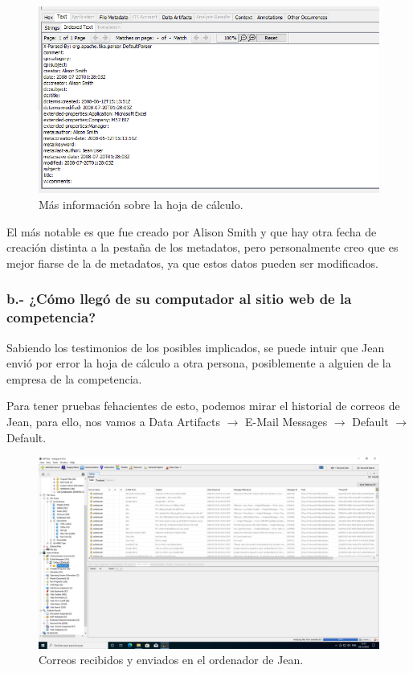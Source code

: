 \documentclass{article}
\begin{document}
\begin{figure}[H]
    \centering
    \includegraphics[width=\textwidth]{imagenes/Windows/Captura de pantalla (7).png}
    \caption{Más información sobre la hoja de cálculo.}
\end{figure}

El más notable es que fue creado por Alison Smith y que hay otra fecha de creación distinta a la pestaña de los metadatos, pero personalmente creo que es mejor fiarse de la de metadatos, ya que estos datos pueden ser modificados.

\newpage

{}
\subsubsection*{b.- ¿Cómo llegó de su computador al sitio web de la competencia?}

Sabiendo los testimonios de los posibles implicados, se puede intuir que Jean envió por error la hoja de cálculo a otra persona, posiblemente a alguien de la empresa de la competencia.

\bigskip

Para tener pruebas fehacientes de esto, podemos mirar el historial de correos de Jean, para ello, nos vamos a Data Artifacts $\rightarrow$ E-Mail Messages $\rightarrow$ Default $\rightarrow$ Default.

\begin{figure}[H]
    \centering
    \includegraphics[width=\textwidth]{imagenes/Windows/Captura de pantalla (8).png}
    \caption{Correos recibidos y enviados en el ordenador de Jean.}
\end{figure}
\end{document}
